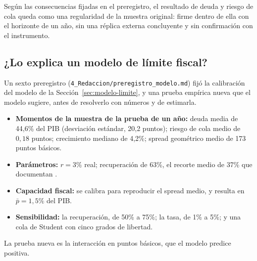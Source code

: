 Según las consecuencias fijadas en el preregistro, el resultado de deuda y riesgo de cola queda como una regularidad de la muestra original: firme dentro de ella con el horizonte de un año, sin una réplica externa concluyente y sin confirmación con el instrumento.

\subsection{¿Lo explica un modelo de límite fiscal?}
\label{sec:modelo-resultados}

Un sexto preregistro (\texttt{4\_Redaccion/preregistro\_modelo.md}) fijó la calibración del modelo de la Sección~\ref{sec:modelo-limite}, y una prueba empírica nueva que el modelo sugiere, antes de resolverlo con números y de estimarla.
\begin{itemize}
    \item \textbf{Momentos de la muestra de la prueba de un año:} deuda media de 44,6\% del PIB (desviación estándar, 20,2 puntos); riesgo de cola medio de $0{,}18$ puntos; crecimiento mediano de 4,2\%; spread geométrico medio de 173 puntos básicos.
    \item \textbf{Parámetros:} $r=3\%$ real; recuperación de 63\%, el recorte medio de 37\% que documentan \citet{CrucesTrebesch2013}.
    \item \textbf{Capacidad fiscal:} se calibra para reproducir el spread medio, y resulta en $\bar p=1{,}5\%$ del PIB.
    \item \textbf{Sensibilidad:} la recuperación, de 50\% a 75\%; la tasa, de 1\% a 5\%; y una cola de Student con cinco grados de libertad.
\end{itemize}
La prueba nueva es la interacción en puntos básicos, que el modelo predice positiva.

